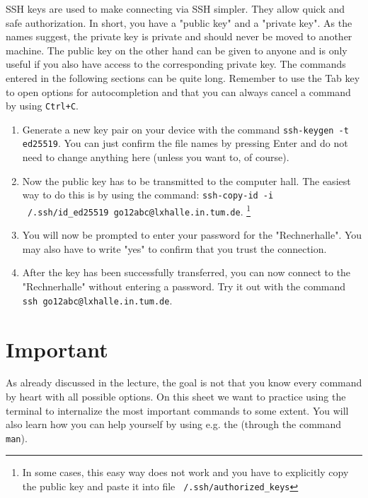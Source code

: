 \documentclass[english]{sheet}
\begin{document}
\begin{exercise}[subtitle=SSH Keys]
    SSH keys are used to make connecting via SSH simpler. They allow quick and safe
    authorization.
    In short, you have a "public key" and a "private key". As the names suggest, the private key is private and should never be moved to another machine. 
    The public key on the other hand can be given to anyone and is only useful if you also have access to the corresponding private key.
    The commands entered in the following sections can be quite long. Remember to use the Tab key to open options for autocompletion and that you can always cancel a
    command by using \texttt{Ctrl+C}.

    \begin{enumerate}
        \item Generate a new key pair on your device with the command \texttt{ssh-keygen -t ed25519}. You can just confirm the file names by pressing Enter and do not need to change anything here (unless you want to, of course).
        \item Now the public key has to be transmitted to the computer hall. The easiest way to do this is by using the command: \newline
            \texttt{ssh-copy-id -i ~/.ssh/id\_ed25519 go12abc@lxhalle.in.tum.de}. 
            \footnote{In some cases, this easy way does not work and you have to explicitly copy the public key and paste it into file \texttt{~/.ssh/authorized_keys}} 
        \item You will now be prompted to enter your password for the "Rechnerhalle". You may also have to write "yes" to confirm that you trust the connection.
        \item After the key has been successfully transferred, you can now connect to the "Rechnerhalle" without entering a password. Try it out with the command \texttt{ssh go12abc@lxhalle.in.tum.de}.
    \end{enumerate}
\end{exercise}

\section{Important}

As already discussed in the lecture, the goal is not that you know every command by heart with all possible options. On this sheet we want to practice using the terminal to internalize the most important commands to some extent. You will also learn how you can help yourself by using e.g. the  (through the command \texttt{man}).
\end{document}
